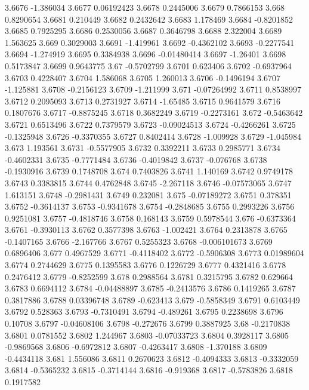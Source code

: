 3.6676  -1.386034
3.6677  0.06192423
3.6678  0.2445006
3.6679  0.7866153
3.668  0.8290654
3.6681  0.210449
3.6682  0.2432642
3.6683  1.178469
3.6684  -0.8201852
3.6685  0.7925295
3.6686  0.2530056
3.6687  0.3646798
3.6688  2.322004
3.6689  1.563625
3.669  0.3029003
3.6691  -1.419961
3.6692  -0.4362102
3.6693  -0.2277541
3.6694  -1.274919
3.6695  0.3384938
3.6696  -0.01480414
3.6697  -1.26401
3.6698  0.5173847
3.6699  0.9643775
3.67  -0.5702799
3.6701  0.623406
3.6702  -0.6937964
3.6703  0.4228407
3.6704  1.586068
3.6705  1.260013
3.6706  -0.1496194
3.6707  -1.125881
3.6708  -0.2156123
3.6709  -1.211999
3.671  -0.07264992
3.6711  0.8538997
3.6712  0.2095093
3.6713  0.2731927
3.6714  -1.65485
3.6715  0.9641579
3.6716  0.1807676
3.6717  -0.8875245
3.6718  0.3682249
3.6719  -0.2273161
3.672  -0.5463642
3.6721  0.6513496
3.6722  0.7379579
3.6723  -0.09024513
3.6724  -0.4266261
3.6725  -0.1325948
3.6726  -0.3370355
3.6727  0.8402414
3.6728  -1.009928
3.6729  -1.045984
3.673  1.193561
3.6731  -0.5577905
3.6732  0.3392211
3.6733  0.2985771
3.6734  -0.4602331
3.6735  -0.7771484
3.6736  -0.4019842
3.6737  -0.076768
3.6738  -0.1930916
3.6739  0.1748708
3.674  0.7403826
3.6741  1.140169
3.6742  0.9749178
3.6743  0.3383815
3.6744  0.4762848
3.6745  -2.267118
3.6746  -0.07573065
3.6747  1.613151
3.6748  -0.2981431
3.6749  0.232081
3.675  -0.07189272
3.6751  0.378351
3.6752  -0.3614137
3.6753  -0.9341678
3.6754  -0.2848685
3.6755  0.2993226
3.6756  0.9251081
3.6757  -0.4818746
3.6758  0.168143
3.6759  0.5978544
3.676  -0.6373364
3.6761  -0.3930113
3.6762  0.3577398
3.6763  -1.002421
3.6764  0.2313878
3.6765  -0.1407165
3.6766  -2.167766
3.6767  0.5255323
3.6768  -0.006101673
3.6769  0.6896406
3.677  0.4967529
3.6771  -0.4118402
3.6772  -0.5906308
3.6773  0.01989604
3.6774  0.2744629
3.6775  0.1395583
3.6776  0.1226729
3.6777  0.4321416
3.6778  0.2476412
3.6779  -0.8252599
3.678  0.2988564
3.6781  0.3215795
3.6782  0.629664
3.6783  0.6694112
3.6784  -0.04488897
3.6785  -0.2413576
3.6786  0.1419265
3.6787  0.3817886
3.6788  0.03396748
3.6789  -0.623413
3.679  -0.5858349
3.6791  0.6103449
3.6792  0.528363
3.6793  -0.7310491
3.6794  -0.489261
3.6795  0.2238698
3.6796  0.10708
3.6797  -0.04608106
3.6798  -0.272676
3.6799  0.3887925
3.68  -0.2170838
3.6801  0.0781552
3.6802  1.244967
3.6803  -0.07033723
3.6804  0.3928117
3.6805  -0.9869568
3.6806  -0.6972812
3.6807  -0.4263417
3.6808  -1.370188
3.6809  -0.4434118
3.681  1.556086
3.6811  0.2670623
3.6812  -0.4094333
3.6813  -0.3332059
3.6814  -0.5365232
3.6815  -0.3714144
3.6816  -0.919368
3.6817  -0.5783826
3.6818  0.1917582
